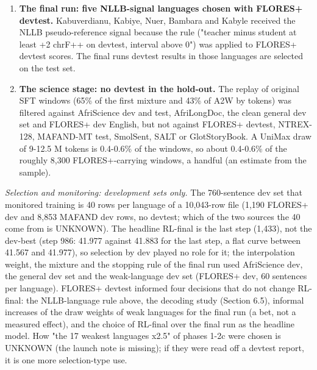 \begin{enumerate}
\item
  \textbf{The final run: five NLLB-signal languages chosen with FLORES+ devtest.} Kabuverdianu, Kabiye, Nuer, Bambara and Kabyle received the NLLB pseudo-reference signal because the rule ("teacher minus student at least +2 chrF++ on devtest, interval above 0") was applied to FLORES+ devtest scores. The final run\textquotesingle s devtest results in those languages are selected on the test set.
\item
  \textbf{The science stage: no devtest in the hold-out.} The replay of original SFT windows (65\% of the first mixture and 43\% of A2W by tokens) was filtered against AfriScience dev and test, AfriLongDoc, the clean general dev set and FLORES+ dev English, but not against FLORES+ devtest, NTREX-128, MAFAND-MT test, SmolSent, SALT or GlotStoryBook. A UniMax draw of 9-12.5 M tokens is 0.4-0.6\% of the windows, so about 0.4-0.6\% of the roughly 8,300 FLORES+-carrying windows, a handful (an estimate from the sample).
\end{enumerate}

\emph{Selection and monitoring: development sets only.} The 760-sentence dev set that monitored training is 40 rows per language of a 10,043-row file (1,190 FLORES+ dev and 8,853 MAFAND dev rows, no devtest; which of the two sources the 40 come from is UNKNOWN). The headline RL-final is the last step (1,433), not the dev-best (step 986: 41.977 against 41.883 for the last step, a flat curve between 41.567 and 41.977), so selection by dev played no role for it; the interpolation weight, the mixture and the stopping rule of the final run used AfriScience dev, the general dev set and the weak-language dev set (FLORES+ dev, 60 sentences per language). FLORES+ devtest informed four decisions that do not change RL-final: the NLLB-language rule above, the decoding study (Section 6.5), informal increases of the draw weights of weak languages for the final run (a bet, not a measured effect), and the choice of RL-final over the final run as the headline model. How "the 17 weakest languages x2.5" of phases 1-2c were chosen is UNKNOWN (the launch note is missing); if they were read off a devtest report, it is one more selection-type use.

